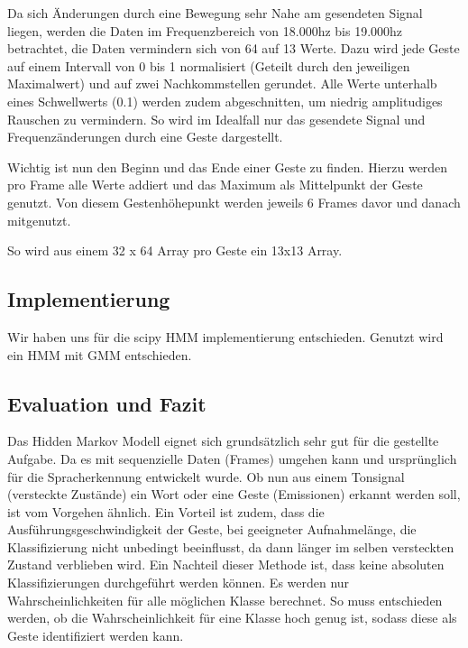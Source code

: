 Da sich Änderungen durch eine Bewegung sehr Nahe am gesendeten Signal liegen, werden die Daten im 
Frequenzbereich von 18.000hz bis 19.000hz betrachtet, die Daten vermindern sich von 64 auf 13 Werte. 
Dazu wird jede Geste auf einem Intervall von 0 bis 1 normalisiert (Geteilt durch den jeweiligen Maximalwert) und 
auf zwei Nachkommstellen gerundet. 
Alle Werte unterhalb eines Schwellwerts (0.1) werden zudem abgeschnitten, um niedrig amplitudiges Rauschen zu vermindern. 
So wird im Idealfall nur das gesendete Signal und Frequenzänderungen durch eine Geste dargestellt.

Wichtig ist nun den Beginn und das Ende einer Geste zu finden. Hierzu werden pro Frame alle Werte addiert 
und das Maximum als Mittelpunkt der Geste genutzt. Von diesem Gestenhöhepunkt werden jeweils 6 Frames davor und danach mitgenutzt.

So wird aus einem 32 x 64 Array pro Geste ein 13x13 Array.


\subsection{Implementierung}  \label{sec:impl}
Wir haben uns für die scipy HMM implementierung entschieden. 
Genutzt wird ein \acl{HMM} mit \acl{GMM} entschieden.


\subsection{Evaluation und Fazit}  \label{sec:result}
Das Hidden Markov Modell eignet sich grundsätzlich sehr gut für die gestellte Aufgabe. Da es mit sequenzielle Daten (Frames) umgehen 
kann und ursprünglich für die Spracherkennung entwickelt wurde. Ob nun aus einem Tonsignal (versteckte Zustände) ein Wort oder 
eine Geste (Emissionen) erkannt werden soll, ist vom Vorgehen ähnlich. Ein Vorteil ist zudem, dass die Ausführungsgeschwindigkeit
 der Geste, bei geeigneter Aufnahmelänge, die Klassifizierung nicht unbedingt beeinflusst, da dann länger im selben versteckten 
 Zustand verblieben wird.
Ein Nachteil dieser Methode ist, dass keine absoluten Klassifizierungen durchgeführt werden können. Es werden nur Wahrscheinlichkeiten für alle möglichen Klasse berechnet. So muss entschieden werden, ob die Wahrscheinlichkeit für eine Klasse hoch genug ist, sodass diese als Geste identifiziert werden kann.